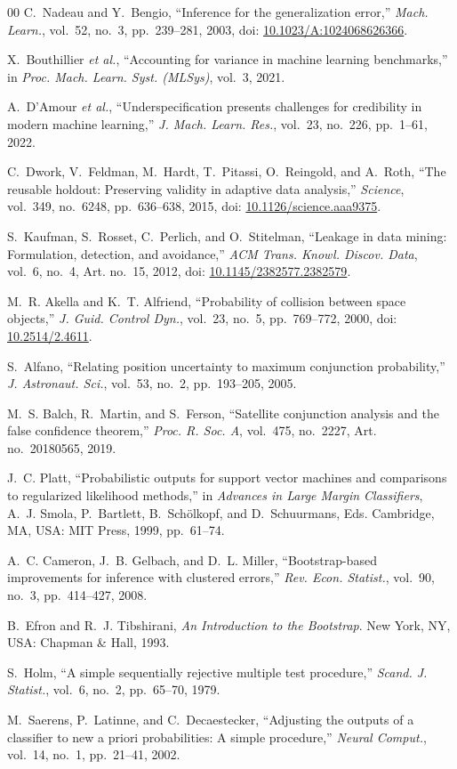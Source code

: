 \documentclass[conference]{IEEEtran}
\begin{document}
\begin{thebibliography}{00}
C.~Nadeau and Y.~Bengio, ``Inference for the generalization error,'' \emph{Mach. Learn.}, vol.~52, no.~3, pp.~239--281, 2003, doi: \url{10.1023/A:1024068626366}.

X.~Bouthillier \emph{et al.}, ``Accounting for variance in machine learning benchmarks,'' in \emph{Proc. Mach. Learn. Syst. (MLSys)}, vol.~3, 2021.

A.~D'Amour \emph{et al.}, ``Underspecification presents challenges for credibility in modern machine learning,'' \emph{J. Mach. Learn. Res.}, vol.~23, no.~226, pp.~1--61, 2022.

C.~Dwork, V.~Feldman, M.~Hardt, T.~Pitassi, O.~Reingold, and A.~Roth, ``The reusable holdout: Preserving validity in adaptive data analysis,'' \emph{Science}, vol.~349, no.~6248, pp.~636--638, 2015, doi: \url{10.1126/science.aaa9375}.

S.~Kaufman, S.~Rosset, C.~Perlich, and O.~Stitelman, ``Leakage in data mining: Formulation, detection, and avoidance,'' \emph{ACM Trans. Knowl. Discov. Data}, vol.~6, no.~4, Art. no.~15, 2012, doi: \url{10.1145/2382577.2382579}.

M.~R. Akella and K.~T. Alfriend, ``Probability of collision between space objects,'' \emph{J. Guid. Control Dyn.}, vol.~23, no.~5, pp.~769--772, 2000, doi: \url{10.2514/2.4611}.

S.~Alfano, ``Relating position uncertainty to maximum conjunction probability,'' \emph{J. Astronaut. Sci.}, vol.~53, no.~2, pp.~193--205, 2005.

M.~S. Balch, R.~Martin, and S.~Ferson, ``Satellite conjunction analysis and the false confidence theorem,'' \emph{Proc. R. Soc. A}, vol.~475, no.~2227, Art. no.~20180565, 2019.

J.~C. Platt, ``Probabilistic outputs for support vector machines and comparisons to regularized likelihood methods,'' in \emph{Advances in Large Margin Classifiers}, A.~J. Smola, P.~Bartlett, B.~Sch\"olkopf, and D.~Schuurmans, Eds. Cambridge, MA, USA: MIT Press, 1999, pp.~61--74.

A.~C. Cameron, J.~B. Gelbach, and D.~L. Miller, ``Bootstrap-based improvements for inference with clustered errors,'' \emph{Rev. Econ. Statist.}, vol.~90, no.~3, pp.~414--427, 2008.

B.~Efron and R.~J. Tibshirani, \emph{An Introduction to the Bootstrap}. New York, NY, USA: Chapman \& Hall, 1993.

S.~Holm, ``A simple sequentially rejective multiple test procedure,'' \emph{Scand. J. Statist.}, vol.~6, no.~2, pp.~65--70, 1979.

M.~Saerens, P.~Latinne, and C.~Decaestecker, ``Adjusting the outputs of a classifier to new a priori probabilities: A simple procedure,'' \emph{Neural Comput.}, vol.~14, no.~1, pp.~21--41, 2002.

\end{thebibliography}
\end{document}

